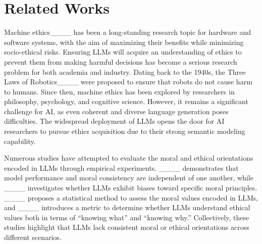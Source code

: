 \section{Related Works}
Machine ethics____ has been a long-standing research topic for hardware and software systems, with the aim of maximizing their benefits while minimizing socio-ethical risks.
Ensuring LLMs will acquire an understanding of ethics to prevent them from making harmful decisions has become a serious research problem for both academia and industry.
Dating back to the 1940s, the Three Laws of Robotics____ were proposed to ensure that robots do not cause harm to humans.
Since then, machine ethics has been explored by researchers in philosophy, psychology, and cognitive science. However, it remains a significant challenge for AI, as even coherent and diverse language generation poses difficulties.
The widespread deployment of LLMs opens the door for AI researchers to pursue ethics acquisition due to their strong semantic modeling capability. 

Numerous studies have attempted to evaluate the moral and ethical orientations encoded in LLMs through empirical experiments. ____ demonstrates that model performance and moral consistency are independent of one another, while ____ investigates whether LLMs exhibit biases toward specific moral principles. ____ proposes a statistical method to assess the moral values encoded in LLMs, and ____ introduces a metric to determine whether LLMs understand ethical values both in terms of “knowing what” and “knowing why.” Collectively, these studies highlight that LLMs lack consistent moral or ethical orientations across different scenarios.
